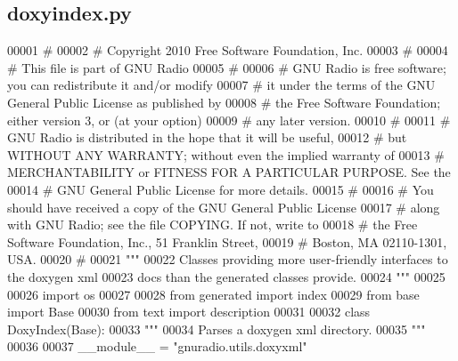 \subsection{doxyindex.\+py}
\label{doxyindex_8py_source}

\begin{DoxyCode}
00001 \textcolor{comment}{#}
00002 \textcolor{comment}{# Copyright 2010 Free Software Foundation, Inc.}
00003 \textcolor{comment}{#}
00004 \textcolor{comment}{# This file is part of GNU Radio}
00005 \textcolor{comment}{#}
00006 \textcolor{comment}{# GNU Radio is free software; you can redistribute it and/or modify}
00007 \textcolor{comment}{# it under the terms of the GNU General Public License as published by}
00008 \textcolor{comment}{# the Free Software Foundation; either version 3, or (at your option)}
00009 \textcolor{comment}{# any later version.}
00010 \textcolor{comment}{#}
00011 \textcolor{comment}{# GNU Radio is distributed in the hope that it will be useful,}
00012 \textcolor{comment}{# but WITHOUT ANY WARRANTY; without even the implied warranty of}
00013 \textcolor{comment}{# MERCHANTABILITY or FITNESS FOR A PARTICULAR PURPOSE.  See the}
00014 \textcolor{comment}{# GNU General Public License for more details.}
00015 \textcolor{comment}{#}
00016 \textcolor{comment}{# You should have received a copy of the GNU General Public License}
00017 \textcolor{comment}{# along with GNU Radio; see the file COPYING.  If not, write to}
00018 \textcolor{comment}{# the Free Software Foundation, Inc., 51 Franklin Street,}
00019 \textcolor{comment}{# Boston, MA 02110-1301, USA.}
00020 \textcolor{comment}{#}
00021 \textcolor{stringliteral}{"""}
00022 \textcolor{stringliteral}{Classes providing more user-friendly interfaces to the doxygen xml}
00023 \textcolor{stringliteral}{docs than the generated classes provide.}
00024 \textcolor{stringliteral}{"""}
00025 
00026 \textcolor{keyword}{import} os
00027 
00028 \textcolor{keyword}{from} generated \textcolor{keyword}{import} index
00029 \textcolor{keyword}{from} base \textcolor{keyword}{import} Base
00030 \textcolor{keyword}{from} text \textcolor{keyword}{import} description
00031 
00032 \textcolor{keyword}{class }DoxyIndex(Base):
00033     \textcolor{stringliteral}{"""}
00034 \textcolor{stringliteral}{    Parses a doxygen xml directory.}
00035 \textcolor{stringliteral}{    """}
00036 
00037     \_\_module\_\_ = \textcolor{stringliteral}{"gnuradio.utils.doxyxml"}

\end{DoxyCode}
